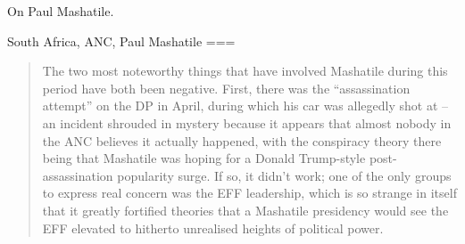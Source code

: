 On Paul Mashatile.

South Africa, ANC, Paul Mashatile
=== 
\begin{quote}
The two most noteworthy things that have involved Mashatile during this period have both been negative. First, there was the “assassination attempt” on the DP in April, during which his car was allegedly shot at – an incident shrouded in mystery because it appears that almost nobody in the ANC believes it actually happened, with the conspiracy theory there being that Mashatile was hoping for a Donald Trump-style post-assassination popularity surge. If so, it didn’t work; one of the only groups to express real concern was the EFF leadership, which is so strange in itself that it greatly fortified theories that a Mashatile presidency would see the EFF elevated to hitherto unrealised heights of political power.
\end{quote}
\nocite{2025f}